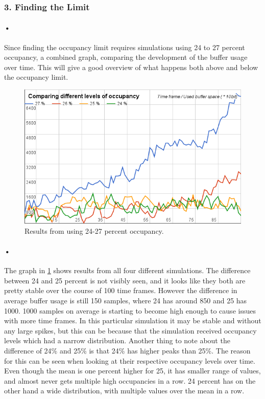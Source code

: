 \documentclass[a4paper, 12pt, openright, twoside]{report}
\begin{document}
\subsubsection{3. Finding the Limit} %

\paragraph{•}
Since finding the occupancy limit requires simulations using 24 to 27 percent occupancy, a combined graph, comparing the development of the buffer usage over time.
This will give a good overview of what happens both above and below the occupancy limit.

\begin{figure}[h!]
	\centering
		\includegraphics[width=1.0\textwidth]{images/24-27-occ.png}
		\caption{Results from using 24-27 percent occupancy.}
		\label{fig:24-27-occ}
\end{figure}

\paragraph{•}
The graph in \ref{fig:24-27-occ} shows results from all four different simulations.
The difference between 24 and 25 percent is not visibly seen, and it looks like they both are pretty stable over the course of 100 time frames.
However the difference in average buffer usage is still 150 samples, where 24 has around 850 and 25 has 1000.
1000 samples on average is starting to become high enough to cause issues with more time frames.
In this particular simulation it may be stable and without any large spikes, but this can be because that the simulation received occupancy levels which had a narrow distribution.
Another thing to note about the difference of 24\% and 25\% is that 24\% has higher peaks than 25\%.
The reason for this can be seen when looking at their respective occupancy levels over time.
Even though the mean is one percent higher for 25, it has smaller range of values, and almost never gets multiple high occupancies in a row.
24 percent has on the other hand a wide distribution, with multiple values over the mean in a row. 
\end{document}
